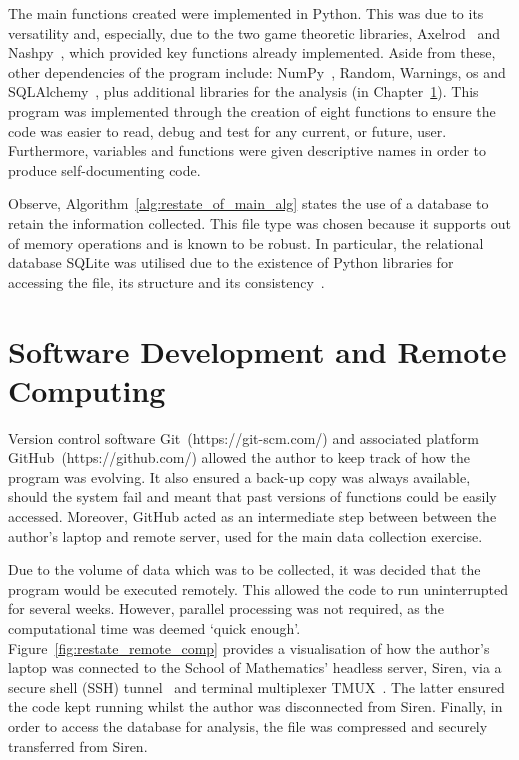 The main functions created were implemented in Python. This was due to its
versatility and, especially, due to the two game theoretic libraries, Axelrod~\cite{axelrodproject}
and Nashpy~\cite{Nashpy2019}, which provided key functions already implemented. Aside from these,
other dependencies of the program include: NumPy~\cite{Walt2011}, Random, Warnings, os and
SQLAlchemy~\cite{Bayer2012}, plus additional libraries for the analysis (in Chapter~\ref{}). This
program was implemented through the creation of eight functions to ensure the
code was easier to read, debug and test for any current, or future, user.
Furthermore, variables and functions were given descriptive names in order to
produce self-documenting code.

Observe, Algorithm~\ref{alg:restate_of_main_alg} states the use of a database to
retain the information collected. This file type was chosen because it supports
out of memory operations and is known to be robust. In particular, the
relational database SQLite was utilised due to the existence of Python libraries
for accessing the file, its structure and its consistency~\cite{Codd2002,ostezer2019}.

\section{Software Development and Remote Computing}
Version control software Git~(https://git-scm.com/) and associated platform
GitHub~(https://github.com/) allowed the author
to keep track of how the program was evolving. It also ensured a back-up copy
was always available, should the system fail and meant that past versions of
functions could be easily accessed. Moreover, GitHub acted as an intermediate
step between between the author's laptop and remote server, used for the main
data collection exercise. 

Due to the volume of data which was to be collected, it was decided that the
program would be executed remotely. This allowed the code to run uninterrupted
for several weeks. However, parallel processing was not required, as the
computational time was deemed `quick enough'.
Figure~\ref{fig:restate_remote_comp} provides a visualisation of how the
author's laptop was connected to the School of Mathematics' headless server,
Siren, via a secure shell (SSH) tunnel~\cite{SSH.COM2016} and terminal multiplexer TMUX~\cite{Marriott}. The latter
ensured the code kept running whilst the author was disconnected from Siren.
Finally, in order to access the database for analysis, the file was compressed
and securely transferred from Siren.

